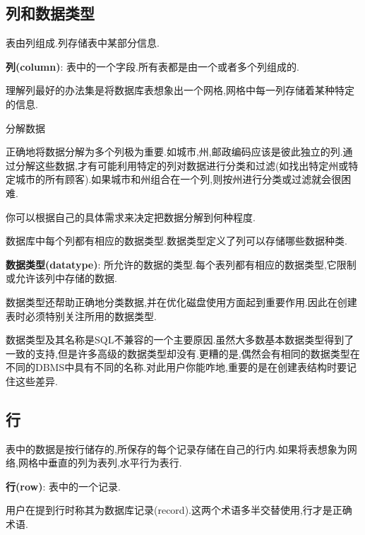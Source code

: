 \documentclass[11pt,a4paper,oneside]{book}
\begin{document}
\subsection{列和数据类型}
表由列组成.列存储表中某部分信息.
\begin{tcolorbox}[colback=blue!7!white,colframe=blue!40]
	\textbf{列(column)}: 表中的一个字段.所有表都是由一个或者多个列组成的.
\end{tcolorbox}
理解列最好的办法集是将数据库表想象出一个网格,网格中每一列存储着某种特定的信息.
\begin{tcolorbox}[colback=pink!10!white,colframe=pink!100!black]
分解数据

正确地将数据分解为多个列极为重要.如城市,州,邮政编码应该是彼此独立的列.通过分解这些数据,才有可能利用特定的列对数据进行分类和过滤(如找出特定州或特定城市的所有顾客).如果城市和州组合在一个列,则按州进行分类或过滤就会很困难.

你可以根据自己的具体需求来决定把数据分解到何种程度.
\end{tcolorbox}

数据库中每个列都有相应的数据类型.数据类型定义了列可以存储哪些数据种类.
\begin{tcolorbox}[colback=blue!7!white,colframe=blue!40]
\textbf{数据类型(datatype)}: 所允许的数据的类型.每个表列都有相应的数据类型,它限制或允许该列中存储的数据.
\end{tcolorbox}
数据类型还帮助正确地分类数据,并在优化磁盘使用方面起到重要作用.因此在创建表时必须特别关注所用的数据类型.
\begin{tcolorbox}[colback=pink!10!white,colframe=pink!100!black]
数据类型及其名称是SQL不兼容的一个主要原因.虽然大多数基本数据类型得到了一致的支持,但是许多高级的数据类型却没有.更糟的是,偶然会有相同的数据类型在不同的DBMS中具有不同的名称.对此用户你能咋地,重要的是在创建表结构时要记住这些差异.
\end{tcolorbox}
\subsection{行}
表中的数据是按行储存的,所保存的每个记录存储在自己的行内.如果将表想象为网络,网格中垂直的列为表列,水平行为表行.
\begin{tcolorbox}[colback=blue!7!white,colframe=blue!40]
\textbf{行(row)}: 表中的一个记录.
\end{tcolorbox}
\begin{tcolorbox}[colback=pink!10!white,colframe=pink!100!black]
用户在提到行时称其为数据库记录(record).这两个术语多半交替使用,行才是正确术语.
\end{tcolorbox}
\end{document}
